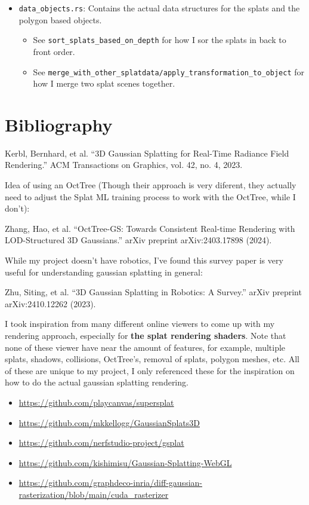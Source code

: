 \documentclass {article}
\begin{document}
\begin{itemize}
\item \lstinline[style=inlinecode]{data_objects.rs}: Contains the actual data structures for the splats and the polygon based objects.
    \begin{itemize}
        \item See \lstinline[style=inlinecode]{sort_splats_based_on_depth} for how I sor the splats in back to front order.
        \item See \lstinline[style=inlinecode]{merge_with_other_splatdata/apply_transformation_to_object} for how I merge two splat scenes together.
    \end{itemize}
\end{itemize}



\section{Bibliography}
     Kerbl, Bernhard, et al. “3D Gaussian Splatting for Real-Time Radiance Field Rendering.” ACM Transactions on Graphics, vol. 42, no. 4, 2023.

     Idea of using an OctTree (Though their approach is very diferent, they actually need to adjust the Splat ML training process to work with the OctTree, while I don't):

     Zhang, Hao, et al. “OctTree-GS: Towards Consistent Real-time Rendering with LOD-Structured 3D Gaussians.” arXiv preprint arXiv:2403.17898 (2024).


     While my project doesn't have robotics, I've found this survey paper is very useful for understanding gaussian splatting in general:

     Zhu, Siting, et al. “3D Gaussian Splatting in Robotics: A Survey.” arXiv preprint arXiv:2410.12262 (2023).


     I took inspiration from many different online viewers to come up with my rendering approach, especially for \textbf{the splat rendering shaders}. Note that none of these viewer have near the amount of features, for example, multiple splats, shadows, collisions, OctTree's, removal of splats, polygon meshes, etc. All of these are unique to my project, I only referenced these for the inspiration on how to do the actual gaussian splatting rendering.
     \begin{itemize}
          \item \href{https://github.com/playcanvas/supersplat}{https://github.com/playcanvas/supersplat}
          \item \href{https://github.com/mkkellogg/GaussianSplats3D}{https://github.com/mkkellogg/GaussianSplats3D}
          \item \href{https://github.com/nerfstudio-project/gsplat}{https://github.com/nerfstudio-project/gsplat}
          \item \href{https://github.com/kishimisu/Gaussian-Splatting-WebGL}{https://github.com/kishimisu/Gaussian-Splatting-WebGL}
          \item \href{https://github.com/graphdeco-inria/diff-gaussian-rasterization/blob/main/cuda\_rasterizer}{https://github.com/graphdeco-inria/diff-gaussian-rasterization/blob/main/cuda\_rasterizer}
     \end{itemize}
\end{document}
